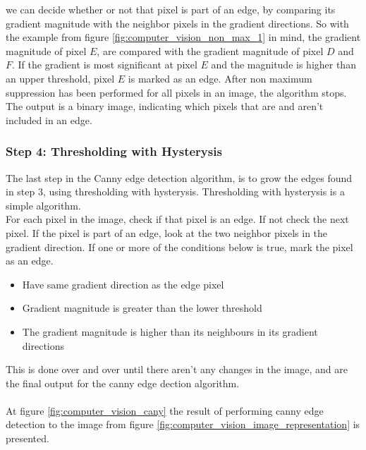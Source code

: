 \documentclass[11pt]{article}
\begin{document}
we can decide whether or not that pixel is part of an edge, by comparing its gradient magnitude with the neighbor pixels in the gradient directions. So with the example from figure \ref{fig:computer_vision_non_max_1} in mind, the gradient magnitude of pixel $E$, are compared with the gradient magnitude of pixel $D$ and $F$. If the gradient is most significant at pixel $E$ and the magnitude is higher than an upper threshold, pixel $E$ is marked as an edge. After non maximum suppression has been performed for all pixels in an image, the algorithm stops. The output is a binary image, indicating which pixels that are and aren't included in an edge.


\subsubsection*{Step 4: Thresholding with Hysterysis}

The last step in the Canny edge detection algorithm, is to grow the edges found in step 3, using thresholding with hysterysis. Thresholding with hysterysis is a simple algorithm.
\\
For each pixel in the image, check if that pixel is an edge. If not check the next pixel. If the pixel is part of an edge, look at the two neighbor pixels in the gradient direction. If one or more of the conditions below is true, mark the pixel as an edge.
\begin{itemize}
    \item Have same gradient direction as the edge pixel
    \item Gradient magnitude is greater than the lower threshold
    \item The gradient magnitude is higher than its neighbours in its gradient directions 
\end{itemize}
This is done over and over until there aren't any changes in the image, and are the final output for the canny edge dection algorithm.
\\ \\
At figure \ref{fig:computer_vision_cany} the result of performing canny edge detection to the image from figure \ref{fig:computer_vision_image_representation} is presented.
\end{document}
